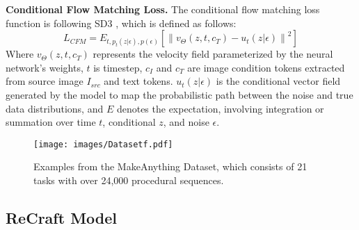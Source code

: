 \noindent \textbf{Conditional Flow Matching Loss.} The conditional flow matching loss function is following SD3 \cite{sd3}, which is defined as follows:
\begin{equation}
L_{CFM} = E_{t, p_t(z|\epsilon), p(\epsilon)} \left[ \left\| v_\Theta(z, t, c_T) - u_t(z|\epsilon) \right\|^2 \right]
\end{equation}
Where $ v_\Theta(z, t, c_T)$ represents the velocity field parameterized by the neural network's weights, $t$ is timestep, $c_I$ and $c_T$ are image condition tokens extracted from source image $I_{src}$ and text tokens. $u_t(z|\epsilon)$ is the conditional vector field generated by the model to map the probabilistic path between the noise and true data distributions, and $E$ denotes the expectation, involving integration or summation over time $t$, conditional $z$, and noise $ \epsilon $. 



\begin{figure*}[ht]
    \centering
    \texttt{[image: images/Datasetf.pdf]} %
    \caption{Examples from the MakeAnything Dataset, which consists of 21 tasks with over 24,000 procedural sequences.}
    \label{fig3}
\end{figure*}







\subsection{ReCraft Model}


